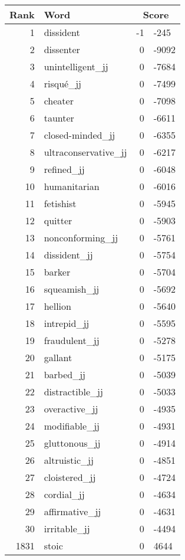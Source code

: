 \begin{longtable}[!htbp]{| rlr@{.}l |}
    \hline
    \textbf{Rank} & \textbf{Word} & \multicolumn{2}{c|}{\textbf{Score}} \\
    \hline
    \endhead
    1 & dissident & -1 & -245 \\
    2 & dissenter & 0 & -9092 \\
    3 & unintelligent\_jj & 0 & -7684 \\
    4 & risqué\_jj & 0 & -7499 \\
    5 & cheater & 0 & -7098 \\
    6 & taunter & 0 & -6611 \\
    7 & closed-minded\_jj & 0 & -6355 \\
    8 & ultraconservative\_jj & 0 & -6217 \\
    9 & refined\_jj & 0 & -6048 \\
    10 & humanitarian & 0 & -6016 \\
    11 & fetishist & 0 & -5945 \\
    12 & quitter & 0 & -5903 \\
    13 & nonconforming\_jj & 0 & -5761 \\
    14 & dissident\_jj & 0 & -5754 \\
    15 & barker & 0 & -5704 \\
    16 & squeamish\_jj & 0 & -5692 \\
    17 & hellion & 0 & -5640 \\
    18 & intrepid\_jj & 0 & -5595 \\
    19 & fraudulent\_jj & 0 & -5278 \\
    20 & gallant & 0 & -5175 \\
    21 & barbed\_jj & 0 & -5039 \\
    22 & distractible\_jj & 0 & -5033 \\
    23 & overactive\_jj & 0 & -4935 \\
    24 & modifiable\_jj & 0 & -4931 \\
    25 & gluttonous\_jj & 0 & -4914 \\
    26 & altruistic\_jj & 0 & -4851 \\
    27 & cloistered\_jj & 0 & -4724 \\
    28 & cordial\_jj & 0 & -4634 \\
    29 & affirmative\_jj & 0 & -4631 \\
    30 & irritable\_jj & 0 & -4494 \\
    1831 & stoic & 0 & 4644 \\

\end{longtable}
